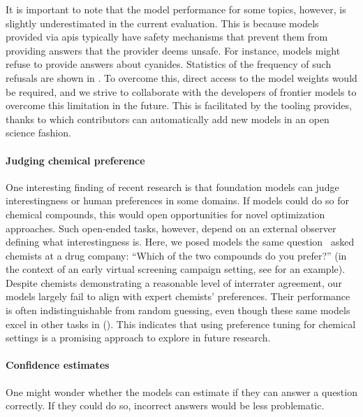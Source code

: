 \documentclass[11pt, oneside]{article}
\begin{document}
\begin{refsegment}
It is important to note that the model performance for some topics, however, is slightly underestimated in the current evaluation.
 This is because models provided via \glspl{api} typically have safety mechanisms that prevent them from providing answers that the provider deems unsafe.
 For instance, models might refuse to provide answers about cyanides. Statistics of the frequency of such refusals are shown in .
 To overcome this, direct access to the model weights would be required, and we strive to collaborate with the developers of frontier models to overcome this limitation in the future.
 This is facilitated by the tooling \chembench provides, thanks to which contributors can automatically add new models in an open science fashion.

\paragraph{Judging chemical preference}

One interesting finding of recent research is that foundation models can judge interestingness or human preferences in some domains.\autocite{zhang2024omniopenendednessmodelshuman, Argyle_2023}
If models could do so for chemical compounds, this would open opportunities for novel optimization approaches.
Such open-ended tasks, however, depend on an external observer defining what interestingness is.\autocite{hughes2024openendednessessentialartificialsuperhuman}
Here, we posed models the same question~\textcite{Choung_2023} asked chemists at a drug company: \enquote{Which of the two compounds do you prefer?} (in the context of an early virtual screening campaign setting, see  for an example).
Despite chemists demonstrating a reasonable level of interrater agreement, our models largely fail to align with expert chemists' preferences. Their performance is often indistinguishable from random guessing, even though these same models excel in other tasks in \chembench ().
This indicates that using preference tuning for chemical settings is a promising approach to explore in future research.


\paragraph{Confidence estimates} One might wonder whether the models can estimate if they can answer a question correctly.
If they could do so, incorrect answers would be less problematic.


\end{refsegment}
\end{document}
